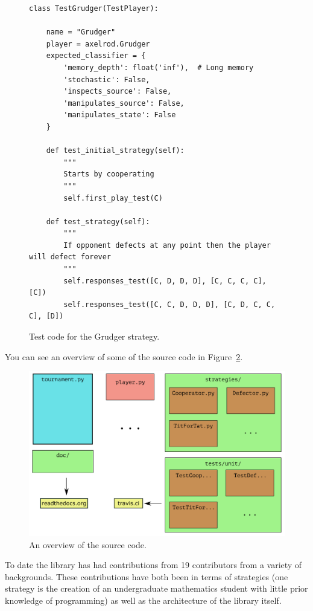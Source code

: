\documentclass{article}
\begin{document}
\begin{figure}[!hbtp]
    \begin{lstlisting}[frame=single]
class TestGrudger(TestPlayer):

    name = "Grudger"
    player = axelrod.Grudger
    expected_classifier = {
        'memory_depth': float('inf'),  # Long memory
        'stochastic': False,
        'inspects_source': False,
        'manipulates_source': False,
        'manipulates_state': False
    }

    def test_initial_strategy(self):
        """
        Starts by cooperating
        """
        self.first_play_test(C)

    def test_strategy(self):
        """
        If opponent defects at any point then the player will defect forever
        """
        self.responses_test([C, D, D, D], [C, C, C, C], [C])
        self.responses_test([C, C, D, D, D], [C, D, C, C, C], [D])
    \end{lstlisting}
    \caption{Test code for the Grudger strategy.}
    \label{fig:grudger_test}
\end{figure}

You can see an overview of some of the source code in Figure~\ref{fig:overview}.

\begin{figure}[!hbtp]
    \centering
    \includegraphics[width=.8\textwidth]{../img/outline_of_library.pdf}
    \caption{An overview of the source code.}
    \label{fig:overview}
\end{figure}

To date the library has had contributions from 19 contributors from a variety of
backgrounds. These contributions have both been in terms of strategies (one
strategy is the creation of an undergraduate mathematics student with little
prior knowledge of programming) as well as the architecture of the library
itself.
\end{document}
